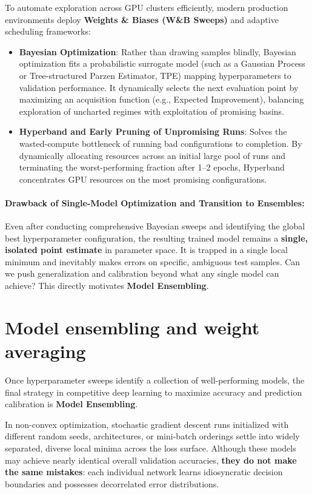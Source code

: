 To automate exploration across GPU clusters efficiently, modern production environments deploy \textbf{Weights \& Biases (W\&B Sweeps)} and adaptive scheduling frameworks:
\begin{itemize}[leftmargin=*]
  \item \textbf{Bayesian Optimization}: Rather than drawing samples blindly, Bayesian optimization fits a probabilistic surrogate model (such as a Gaussian Process or Tree-structured Parzen Estimator, TPE) mapping hyperparameters to validation performance. It dynamically selects the next evaluation point by maximizing an acquisition function (e.g., Expected Improvement), balancing exploration of uncharted regimes with exploitation of promising basins.
  \item \textbf{Hyperband and Early Pruning of Unpromising Runs}: Solves the wasted-compute bottleneck of running bad configurations to completion. By dynamically allocating resources across an initial large pool of runs and terminating the worst-performing fraction after 1--2 epochs, Hyperband concentrates GPU resources on the most promising configurations.
\end{itemize}

\paragraph{Drawback of Single-Model Optimization and Transition to Ensembles:}
Even after conducting comprehensive Bayesian sweeps and identifying the global best hyperparameter configuration, the resulting trained model remains a \textbf{single, isolated point estimate} in parameter space. It is trapped in a single local minimum and inevitably makes errors on specific, ambiguous test samples. Can we push generalization and calibration beyond what any single model can achieve? This directly motivates \textbf{Model Ensembling}.

\section{Model ensembling and weight averaging}
\label{sec:model_ensembles_polyak_ema}

Once hyperparameter sweeps identify a collection of well-performing models, the final strategy in competitive deep learning to maximize accuracy and prediction calibration is \textbf{Model Ensembling}.

In non-convex optimization, stochastic gradient descent runs initialized with different random seeds, architectures, or mini-batch orderings settle into widely separated, diverse local minima across the loss surface. Although these models may achieve nearly identical overall validation accuracies, \textbf{they do not make the same mistakes}: each individual network learns idiosyncratic decision boundaries and possesses decorrelated error distributions.

